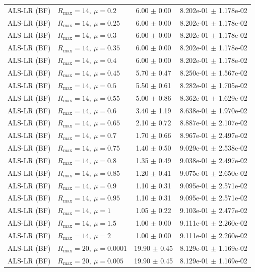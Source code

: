 \begin{table}[t]
\begin{tabular}{@{}llcc@{}}
ALS-LR (BF) & \(R_{\max}=14,\ \mu=0.2\) & 6.00 $\pm$ 0.00 & 8.202e-01 $\pm$ 1.178e-02 \\
ALS-LR (BF) & \(R_{\max}=14,\ \mu=0.25\) & 6.00 $\pm$ 0.00 & 8.202e-01 $\pm$ 1.178e-02 \\
ALS-LR (BF) & \(R_{\max}=14,\ \mu=0.3\) & 6.00 $\pm$ 0.00 & 8.202e-01 $\pm$ 1.178e-02 \\
ALS-LR (BF) & \(R_{\max}=14,\ \mu=0.35\) & 6.00 $\pm$ 0.00 & 8.202e-01 $\pm$ 1.178e-02 \\
ALS-LR (BF) & \(R_{\max}=14,\ \mu=0.4\) & 6.00 $\pm$ 0.00 & 8.202e-01 $\pm$ 1.178e-02 \\
ALS-LR (BF) & \(R_{\max}=14,\ \mu=0.45\) & 5.70 $\pm$ 0.47 & 8.250e-01 $\pm$ 1.567e-02 \\
ALS-LR (BF) & \(R_{\max}=14,\ \mu=0.5\) & 5.50 $\pm$ 0.61 & 8.282e-01 $\pm$ 1.705e-02 \\
ALS-LR (BF) & \(R_{\max}=14,\ \mu=0.55\) & 5.00 $\pm$ 0.86 & 8.362e-01 $\pm$ 1.629e-02 \\
ALS-LR (BF) & \(R_{\max}=14,\ \mu=0.6\) & 3.40 $\pm$ 1.19 & 8.638e-01 $\pm$ 1.970e-02 \\
ALS-LR (BF) & \(R_{\max}=14,\ \mu=0.65\) & 2.10 $\pm$ 0.72 & 8.887e-01 $\pm$ 2.107e-02 \\
ALS-LR (BF) & \(R_{\max}=14,\ \mu=0.7\) & 1.70 $\pm$ 0.66 & 8.967e-01 $\pm$ 2.497e-02 \\
ALS-LR (BF) & \(R_{\max}=14,\ \mu=0.75\) & 1.40 $\pm$ 0.50 & 9.029e-01 $\pm$ 2.538e-02 \\
ALS-LR (BF) & \(R_{\max}=14,\ \mu=0.8\) & 1.35 $\pm$ 0.49 & 9.038e-01 $\pm$ 2.497e-02 \\
ALS-LR (BF) & \(R_{\max}=14,\ \mu=0.85\) & 1.20 $\pm$ 0.41 & 9.075e-01 $\pm$ 2.650e-02 \\
ALS-LR (BF) & \(R_{\max}=14,\ \mu=0.9\) & 1.10 $\pm$ 0.31 & 9.095e-01 $\pm$ 2.571e-02 \\
ALS-LR (BF) & \(R_{\max}=14,\ \mu=0.95\) & 1.10 $\pm$ 0.31 & 9.095e-01 $\pm$ 2.571e-02 \\
ALS-LR (BF) & \(R_{\max}=14,\ \mu=1\) & 1.05 $\pm$ 0.22 & 9.103e-01 $\pm$ 2.477e-02 \\
ALS-LR (BF) & \(R_{\max}=14,\ \mu=1.5\) & 1.00 $\pm$ 0.00 & 9.111e-01 $\pm$ 2.260e-02 \\
ALS-LR (BF) & \(R_{\max}=14,\ \mu=2\) & 1.00 $\pm$ 0.00 & 9.111e-01 $\pm$ 2.260e-02 \\
ALS-LR (BF) & \(R_{\max}=20,\ \mu=0.0001\) & 19.90 $\pm$ 0.45 & 8.129e-01 $\pm$ 1.169e-02 \\
ALS-LR (BF) & \(R_{\max}=20,\ \mu=0.005\) & 19.90 $\pm$ 0.45 & 8.129e-01 $\pm$ 1.169e-02 \\

\end{tabular}
\end{table}
